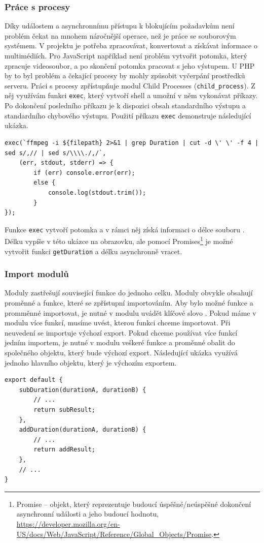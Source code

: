 \subsubsection{Práce s procesy}
Díky událostem a asynchronnímu přístupu k blokujícím požadavkům není problém čekat na mnohem náročnější operace, než je práce se souborovým systémem. V projektu je potřeba zpracovávat, konvertovat a získávat informace o multimédiích. Pro JavaScript například není problém vytvořit potomka, který zpracuje videosoubor, a po skončení potomka pracovat s jeho výstupem. U PHP by to byl problém a čekající procesy by mohly způsobit vyčerpání prostředků serveru. Práci s procesy zpřístupňuje modul Child Processes (\texttt{child\_process}). Z něj využívám funkci \texttt{exec}, který vytvoří shell a umožní v něm vykonávat příkazy. Po dokončení posledního příkazu je k dispozici obsah standardního výstupu a standardního chybového výstupu. Použití příkazu \texttt{exec} demonstruje následující ukázka.
\begin{lstlisting}[style=JavaScript]
exec(`ffmpeg -i ${filepath} 2>&1 | grep Duration | cut -d \' \' -f 4 | sed s/,// | sed s/\\\\./,/`,
    (err, stdout, stderr) => {
        if (err) console.error(err);
        else {
            console.log(stdout.trim());
        }
});
\end{lstlisting}
Funkce \texttt{exec} vytvoří potomka a v rámci něj získá informaci o délce souboru . Délku vypíše v této ukázce na obrazovku, ale pomocí Promises\footnote{Promise -- objekt, který reprezentuje budoucí úspěšné/neúspěšné dokončení asynchronní události a jeho budoucí hodnotu, \url{https://developer.mozilla.org/en-US/docs/Web/JavaScript/Reference/Global_Objects/Promise}.} je možné vytvořit funkci \texttt{getDuration} a délku asynchronně vracet.

\subsubsection{Import modulů}
Moduly zastřešují související funkce do jednoho celku. Moduly obvykle obsahují proměnné a funkce, které se zpřístupní importováním. Aby bylo možné funkce a promměnné importovat, je nutné v modulu uvádět klíčové slovo . Pokud máme v modulu více funkcí, musíme uvést, kterou funkci chceme importovat. Při neuvedení se importuje výchozí export. Pokud chceme používat více funkcí jedním importem, je nutné v modulu veškeré funkce a proměnné obalit do společného objektu, který bude výchozí export. Následující ukázka využívá jednoho hlavního objektu, který je výchozím exportem.
\begin{lstlisting}[style=JavaScript]
export default {
    subDuration(durationA, durationB) {
        // ...
        return subResult;
    },
    addDuration(durationA, durationB) {
        // ...
        return addResult;
    },
    // ...
}
\end{lstlisting}

